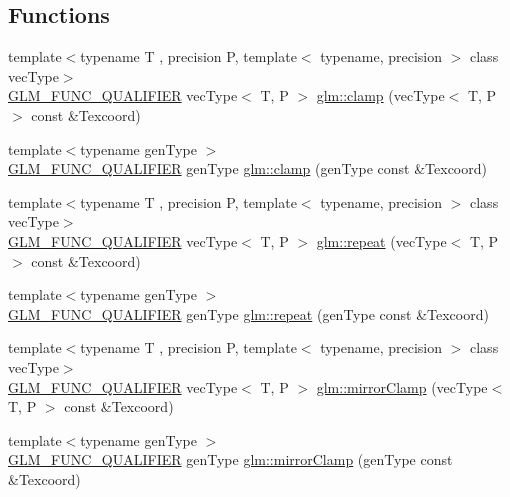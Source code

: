 \subsection*{Functions}
\begin{DoxyCompactItemize}
\item 
{\footnotesize template$<$typename T , precision P, template$<$ typename, precision $>$ class vec\+Type$>$ }\\\mbox{\hyperlink{setup_8hpp_a33fdea6f91c5f834105f7415e2a64407}{G\+L\+M\+\_\+\+F\+U\+N\+C\+\_\+\+Q\+U\+A\+L\+I\+F\+I\+ER}} vec\+Type$<$ T, P $>$ \mbox{\hyperlink{namespaceglm_a60133991ee6051962489d4e30ee13417}{glm\+::clamp}} (vec\+Type$<$ T, P $>$ const \&Texcoord)
\item 
{\footnotesize template$<$typename gen\+Type $>$ }\\\mbox{\hyperlink{setup_8hpp_a33fdea6f91c5f834105f7415e2a64407}{G\+L\+M\+\_\+\+F\+U\+N\+C\+\_\+\+Q\+U\+A\+L\+I\+F\+I\+ER}} gen\+Type \mbox{\hyperlink{group__gtx__wrap_ga6c0cc6bd1d67ea1008d2592e998bad33}{glm\+::clamp}} (gen\+Type const \&Texcoord)
\item 
{\footnotesize template$<$typename T , precision P, template$<$ typename, precision $>$ class vec\+Type$>$ }\\\mbox{\hyperlink{setup_8hpp_a33fdea6f91c5f834105f7415e2a64407}{G\+L\+M\+\_\+\+F\+U\+N\+C\+\_\+\+Q\+U\+A\+L\+I\+F\+I\+ER}} vec\+Type$<$ T, P $>$ \mbox{\hyperlink{namespaceglm_ac4c923ddb75730f17cc23201a6d3759c}{glm\+::repeat}} (vec\+Type$<$ T, P $>$ const \&Texcoord)
\item 
{\footnotesize template$<$typename gen\+Type $>$ }\\\mbox{\hyperlink{setup_8hpp_a33fdea6f91c5f834105f7415e2a64407}{G\+L\+M\+\_\+\+F\+U\+N\+C\+\_\+\+Q\+U\+A\+L\+I\+F\+I\+ER}} gen\+Type \mbox{\hyperlink{group__gtx__wrap_ga809650c6310ea7c42666e918c117fb6f}{glm\+::repeat}} (gen\+Type const \&Texcoord)
\item 
{\footnotesize template$<$typename T , precision P, template$<$ typename, precision $>$ class vec\+Type$>$ }\\\mbox{\hyperlink{setup_8hpp_a33fdea6f91c5f834105f7415e2a64407}{G\+L\+M\+\_\+\+F\+U\+N\+C\+\_\+\+Q\+U\+A\+L\+I\+F\+I\+ER}} vec\+Type$<$ T, P $>$ \mbox{\hyperlink{namespaceglm_aa53ab6c4ce8a2f0adcbf36c5cbea6685}{glm\+::mirror\+Clamp}} (vec\+Type$<$ T, P $>$ const \&Texcoord)
\item 
{\footnotesize template$<$typename gen\+Type $>$ }\\\mbox{\hyperlink{setup_8hpp_a33fdea6f91c5f834105f7415e2a64407}{G\+L\+M\+\_\+\+F\+U\+N\+C\+\_\+\+Q\+U\+A\+L\+I\+F\+I\+ER}} gen\+Type \mbox{\hyperlink{group__gtx__wrap_gaa6856a0a048d2749252848da35e10c8b}{glm\+::mirror\+Clamp}} (gen\+Type const \&Texcoord)

\end{DoxyCompactItemize}

